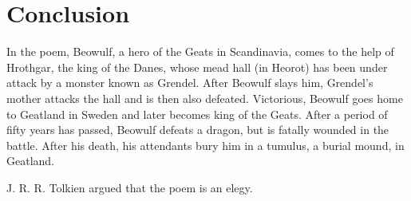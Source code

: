 \documentclass{hrothgar-memo}
\begin{document}
\section{Conclusion}
In the poem, Beowulf, a hero of the Geats in Scandinavia, comes to the help of Hrothgar, the king of the Danes, whose mead hall (in Heorot) has been under attack by a monster known as Grendel. After Beowulf slays him, Grendel's mother attacks the hall and is then also defeated. Victorious, Beowulf goes home to Geatland in Sweden and later becomes king of the Geats. After a period of fifty years has passed, Beowulf defeats a dragon, but is fatally wounded in the battle. After his death, his attendants bury him in a tumulus, a burial mound, in Geatland.

J. R. R. Tolkien argued that the poem is an elegy.


\qedrule
\nocite{*}
\makebibsection

\end{document}
